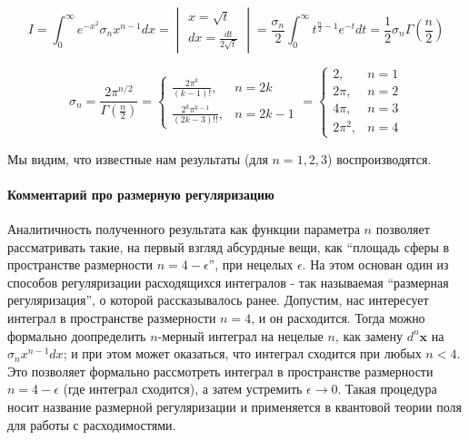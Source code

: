 \documentclass[a4paper,12pt]{article}
\begin{document}
\[
I=\int_{0}^{\infty}e^{-x^{2}}\sigma_{n}x^{n-1}dx=\begin{vmatrix}x=\sqrt{t}\\
dx=\frac{dt}{2\sqrt{t}}
\end{vmatrix}=\frac{\sigma_{n}}{2}\int_{0}^{\infty}t^{\frac{n}{2}-1}e^{-t}dt=\frac{1}{2}\sigma_{n}\Gamma\left(\frac{n}{2}\right)
\]


\[
\sigma_{n}=\frac{2\pi^{n/2}}{\Gamma\left(\frac{n}{2}\right)}=\begin{cases}
\frac{2\pi^{k}}{(k-1)!}, & n=2k\\
\frac{2^{k}\pi^{k-1}}{(2k-3)!!}, & n=2k-1
\end{cases}=\begin{cases}
2, & n=1\\
2\pi, & n=2\\
4\pi, & n=3\\
2\pi^{2}, & n=4
\end{cases}
\]

 \noindent
Мы видим, что известные нам результаты (для $n=1,2,3$) воспроизводятся.


\paragraph{Комментарий про размерную регуляризацию}

Аналитичность полученного результата как функции параметра $n$ позволяет
рассматривать такие, на первый взгляд абсурдные вещи, как ``площадь
сферы в пространстве размерности $n=4-\epsilon$'', при нецелых $\epsilon$.
На этом основан один из способов регуляризации расходящихся интегралов
- так называемая ``размерная регуляризация'', о которой рассказывалось
ранее. 
 \noindent
Допустим, нас интересует интеграл в пространстве размерности $n=4$,
и он расходится. Тогда можно формально доопределить $n$-мерный интеграл
на нецелые $n$, как замену $d^{n}\mathbf{x}$ на $\sigma_{n}x^{n-1}dx$;
и при этом может оказаться, что интеграл сходится при любых $n<4$.
Это позволяет формально рассмотреть интеграл в пространстве размерности
$n=4-\epsilon$ (где интеграл сходится), а затем устремить $\epsilon\to0$. Такая процедура носит название размерной регуляризации и применяется в квантовой теории поля для работы с расходимостями.
\end{document}

